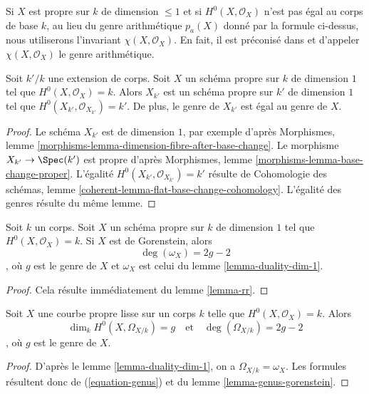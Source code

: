 \medskip\noindent
Si $X$ est propre sur $k$ de dimension $\leq 1$ et si $H^0(X, \mathcal{O}_X)$ n'est pas égal au corps de base $k$, au lieu du genre arithmétique $p_a(X)$ donné par la formule ci-dessus, nous utiliserons l'invariant $\chi(X, \mathcal{O}_X)$. En fait, il est préconisé dans \cite[page 276]{FAC} et \cite[Introduction]{Hirzebruch} d'appeler $\chi(X, \mathcal{O}_X)$ le genre arithmétique.

\begin{lemma}
\label{lemma-genus-base-change}
Soit $k'/k$ une extension de corps. Soit $X$ un schéma propre sur $k$ de dimension $1$ tel que $H^0(X, \mathcal{O}_X) = k$. Alors $X_{k'}$ est un schéma propre sur $k'$ de dimension $1$ tel que $H^0(X_{k'}, \mathcal{O}_{X_{k'}}) = k'$. De plus, le genre de $X_{k'}$ est égal au genre de $X$.
\end{lemma}

\begin{proof}
Le schéma $X_{k'}$ est de dimension $1$, par exemple d'après Morphismes, lemme \ref{morphisms-lemma-dimension-fibre-after-base-change}. Le morphisme $X_{k'} \to \Spec(k')$ est propre d'après Morphismes, lemme \ref{morphisms-lemma-base-change-proper}. L'égalité $H^0(X_{k'}, \mathcal{O}_{X_{k'}}) = k'$ résulte de Cohomologie des schémas, lemme \ref{coherent-lemma-flat-base-change-cohomology}. L'égalité des genres résulte du même lemme.
\end{proof}

\begin{lemma}
\label{lemma-genus-gorenstein}
Soit $k$ un corps. Soit $X$ un schéma propre sur $k$ de dimension $1$ tel que $H^0(X, \mathcal{O}_X) = k$. Si $X$ est de Gorenstein, alors $$
\deg(\omega_X) = 2g - 2
$$, où $g$ est le genre de $X$ et $\omega_X$ est celui du lemme \ref{lemma-duality-dim-1}.
\end{lemma}

\begin{proof}
Cela résulte immédiatement du lemme \ref{lemma-rr}.
\end{proof}

\begin{lemma}
\label{lemma-genus-smooth}
Soit $X$ une courbe propre lisse sur un corps $k$ telle que $H^0(X, \mathcal{O}_X) = k$. Alors $$
\dim_k H^0(X, \Omega_{X/k}) = g
\quad\text{et}\quad
\deg(\Omega_{X/k}) = 2g - 2
$$, où $g$ est le genre de $X$.
\end{lemma}

\begin{proof}
D'après le lemme \ref{lemma-duality-dim-1}, on a $\Omega_{X/k} = \omega_X$. Les formules résultent donc de (\ref{equation-genus}) et du lemme \ref{lemma-genus-gorenstein}.
\end{proof}






